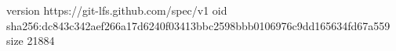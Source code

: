 version https://git-lfs.github.com/spec/v1
oid sha256:dc843c342aef266a17d6240f03413bbc2598bbb0106976c9dd165634fd67a559
size 21884
